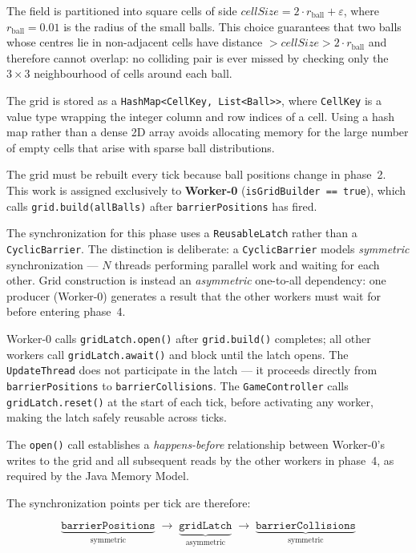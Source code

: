 \documentclass[12pt,a4paper]{article}
\begin{document}
\begin{enumerate}
The field is partitioned into square cells of side $\mathit{cellSize} = 2 \cdot r_{\text{ball}} + \varepsilon$, where $r_{\text{ball}} = 0.01$ is the radius of the small balls. This choice guarantees that two balls whose centres lie in non-adjacent cells have distance $> \mathit{cellSize} > 2 \cdot r_{\text{ball}}$ and therefore cannot overlap: no colliding pair is ever missed by checking only the $3 \times 3$ neighbourhood of cells around each ball.
 
The grid is stored as a \texttt{HashMap<CellKey, List<Ball>>}, where \texttt{CellKey} is a value type wrapping the integer column and row indices of a cell. Using a hash map rather than a dense 2D array avoids allocating memory for the large number of empty cells that arise with sparse ball distributions.
 
The grid must be rebuilt every tick because ball positions change in phase~2. This work is assigned exclusively to \textbf{Worker-0} (\texttt{isGridBuilder == true}), which calls \texttt{grid.build(allBalls)} after \texttt{barrierPositions} has fired.
 
The synchronization for this phase uses a \texttt{ReusableLatch} rather than a \texttt{CyclicBarrier}. The distinction is deliberate: a \texttt{CyclicBarrier} models \emph{symmetric} synchronization — $N$ threads performing parallel work and waiting for each other. Grid construction is instead an \emph{asymmetric} one-to-all dependency: one producer (Worker-0) generates a result that the other workers must wait for before entering phase~4.
 
Worker-0 calls \texttt{gridLatch.open()} after \texttt{grid.build()} completes; all other workers call \texttt{gridLatch.await()} and block until the latch opens. The \texttt{UpdateThread} does not participate in the latch — it proceeds directly from \texttt{barrierPositions} to \texttt{barrierCollisions}. The \texttt{GameController} calls \texttt{gridLatch.reset()} at the start of each tick, before activating any worker, making the latch safely reusable across ticks.
 
The \texttt{open()} call establishes a \emph{happens-before} relationship between Worker-0's writes to the grid and all subsequent reads by the other workers in phase~4, as required by the Java Memory Model.
 
The synchronization points per tick are therefore:
 
\[
\underbrace{\texttt{barrierPositions}}_{\text{symmetric}} \;\to\;
\underbrace{\texttt{gridLatch}}_{\text{asymmetric}} \;\to\;
\underbrace{\texttt{barrierCollisions}}_{\text{symmetric}}
\]
 

\end{enumerate}
\end{document}
